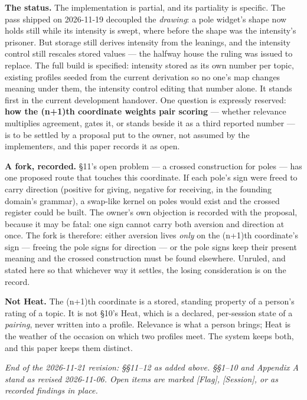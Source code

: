 \textbf{The status.} The implementation is partial, and its partiality
is specific. The pass shipped on 2026-11-19 decoupled the
\emph{drawing}: a pole widget's shape now holds still while its
intensity is swept, where before the shape was the intensity's prisoner.
But storage still derives intensity from the leanings, and the intensity
control still rescales stored values --- the halfway house the ruling
was issued to replace. The full build is specified: intensity stored as
its own number per topic, existing profiles seeded from the current
derivation so no one's map changes meaning under them, the intensity
control editing that number alone. It stands first in the current
development handover. One question is expressly reserved: \textbf{how
the (n+1)th coordinate weights pair scoring} --- whether relevance
multiplies agreement, gates it, or stands beside it as a third reported
number --- is to be settled by a proposal put to the owner, not assumed
by the implementers, and this paper records it as open.

\textbf{A fork, recorded.} \S 11's open problem --- a crossed construction
for poles --- has one proposed route that touches this coordinate. If
each pole's sign were freed to carry direction (positive for giving,
negative for receiving, in the founding domain's grammar), a swap-like
kernel on poles would exist and the crossed register could be built. The
owner's own objection is recorded with the proposal, because it may be
fatal: one sign cannot carry both aversion and direction at once. The
fork is therefore: either aversion lives \emph{only} on the (n+1)th
coordinate's sign --- freeing the pole signs for direction --- or the
pole signs keep their present meaning and the crossed construction must
be found elsewhere. Unruled, and stated here so that whichever way it
settles, the losing consideration is on the record.

\textbf{Not Heat.} The (n+1)th coordinate is a stored, standing property
of a person's rating of a topic. It is not \S 10's Heat, which is a
declared, per-session state of a \emph{pairing}, never written into a
profile. Relevance is what a person brings; Heat is the weather of the
occasion on which two profiles meet. The system keeps both, and this
paper keeps them distinct.

\emph{End of the 2026-11-21 revision: \S \S 11--12 as added above. \S \S 1--10
and Appendix A stand as revised 2026-11-06. Open items are marked
{[}Flag{]}, {[}Session{]}, or as recorded findings in place.}

